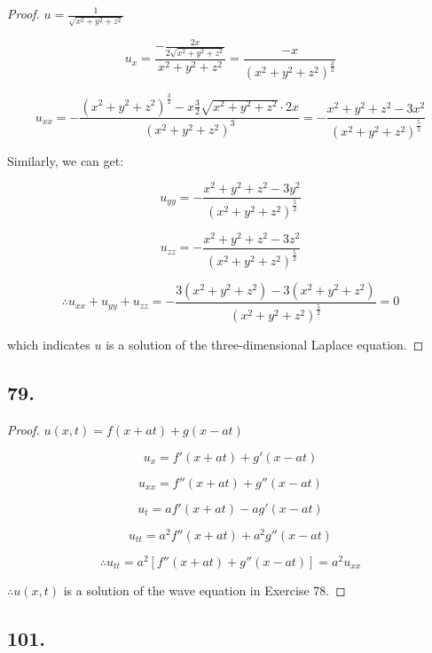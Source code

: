 \documentclass{article}
\begin{document}
    \begin{proof}
        $u = \frac{1}{\sqrt{x^2+y^2+z^2}}$

        $$u_x = \frac{-\frac{2x}{2\sqrt{x^2 + y^2 + z^2}}}{x^2 + y^2 + z^2} = \frac{-x}{(x^2 + y^2 + z^2)^{\frac 3 2}}$$

        $$u_{xx} = -\frac{(x^2+y^2+z^2)^{\frac 3 2} - x \frac 3 2 \sqrt{x^2 + y^2 + z^2} \cdot 2x}{(x^2 + y^2 + z^2)^3} = -\frac{x^2 + y^2 + z^2 - 3x^2}{(x^2 + y^2 + z^2)^{\frac 5 2}}$$

        Similarly, we can get:

        $$u_{yy} = -\frac{x^2 + y^2 + z^2 - 3y^2}{(x^2+y^2+z^2)^{\frac 5 2}}$$

        $$u_{zz} = -\frac{x^2 + y^2 + z^2 - 3z^2}{(x^2+y^2+z^2)^{\frac 5 2}}$$

        $$\therefore u_{xx} + u_{yy} + u_{zz} = -\frac{3(x^2 + y^2 + z^2) - 3(x^2 + y^2 + z^2)}{(x^2+y^2+z^2)^{\frac 5 2}} = 0$$

        which indicates $u$ is a solution of the three-dimensional Laplace equation.
    \end{proof}

    \subsection*{79. }

    \begin{proof}
        $u(x, t) = f(x + at) + g(x-at)$

        $$u_x = f'(x + at) + g'(x-at)$$

        $$u_{xx} = f''(x + at) + g''(x-at)$$

        $$u_t = af'(x + at) - ag'(x-at)$$

        $$u_{tt} = a^2f''(x + at) + a^2g''(x-at)$$

        $$\therefore u_{tt} = a^2[f''(x+at) + g''(x-at)] = a^2u_{xx}$$

        $\therefore u(x, t)$ is a solution of the wave equation in Exercise 78.
    \end{proof}

    \subsection*{101. }
\end{document}
